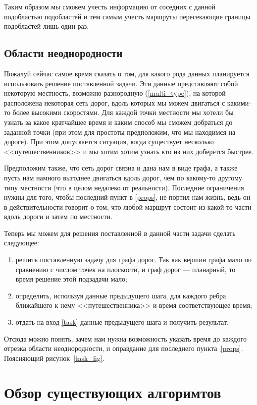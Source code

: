 \documentclass[12pt]{article}
\begin{document}
Таким образом мы сможем учесть информацию от соседних с данной подобластью подобластей и тем самым учесть маршруты пересекающие границы подобластей лишь один раз.

\subsection{Области неоднородности}
Пожалуй сейчас самое время сказать о том, для какого рода данных планируется использовать решение поставленной задачи. Эти данные представляют собой некоторую местность, возможно разнородную (\ref{multi_type}), на которой расположена некоторая сеть дорог, вдоль которых мы можем двигаться с какими-то более высокими скоростями. Для каждой точки местности мы хотели бы узнать за какое кратчайшее время и каким способ мы сможем добраться до заданной точки (при этом для простоты предположим, что мы находимся на дороге). При этом допускается ситуация, когда существует несколько  <<путешественников>> и мы хотим хотим узнать кто из них доберется быстрее. 

Предположим также, что сеть дорог связна и дана нам в виде графа, а также пусть нам намного выгоднее двигаться вдоль дорог, чем по какому-то другому типу местности (что в целом недалеко от реальности). Последние ограничения нужны для того, чтобы  последний пункт в \ref{props}, не портил нам жизнь, ведь он в действительности говорит о том, что любой маршрут состоит из какой-то  части вдоль дороги и затем по местности. 

Теперь мы можем для решения поставленной в данной части задачи сделать следующее:
\begin{enumerate}
\item решить поставленную задачу для графа дорог. Так как вершин графа мало по сравнению с числом точек на плоскости, и граф дорог --- планарный, то время решение этой подзадачи мало;
\item определить, используя данные предыдущего шага, для каждого ребра ближайшего к нему <<путешественника>> и время соответствующее время;
\item отдать на вход \ref{task} данные предыдущего шага и получить результат.
\end{enumerate}

Отсюда можно понять, зачем нам нужна возможность указать время до каждого отрезка области неоднородности, и оправдание для последнего пункта~\ref{props}. Поясняющий рисунок~\ref{task_fig}.

\section{Обзор существующих алгоримтов}
\end{document}
